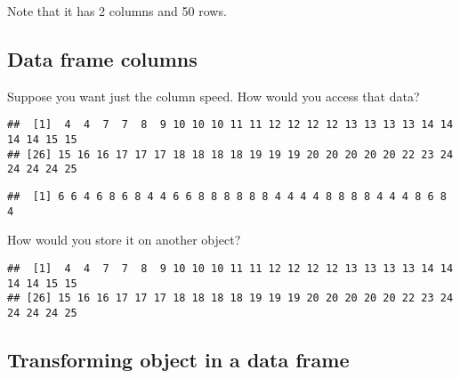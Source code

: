 \documentclass[
]{article}
\newenvironment{Shaded}{\begin{snugshade}}{\end{snugshade}}
\newcommand{\CommentTok}[1]{\textcolor[rgb]{0.56,0.35,0.01}{\textit{#1}}}
\newcommand{\NormalTok}[1]{#1}
\newcommand{\OtherTok}[1]{\textcolor[rgb]{0.56,0.35,0.01}{#1}}
\newcommand{\SpecialCharTok}[1]{\textcolor[rgb]{0.81,0.36,0.00}{\textbf{#1}}}
\begin{document}
Note that it has 2 columns and 50 rows.

\hypertarget{data-frame-columns}{%
\subsection{Data frame columns}\label{data-frame-columns}}

Suppose you want just the column speed. How would you access that data?

\begin{Shaded}
\end{Shaded}

\begin{verbatim}
##  [1]  4  4  7  7  8  9 10 10 10 11 11 12 12 12 12 13 13 13 13 14 14 14 14 15 15
## [26] 15 16 16 17 17 17 18 18 18 18 19 19 19 20 20 20 20 20 22 23 24 24 24 24 25
\end{verbatim}

\begin{Shaded}
\end{Shaded}

\begin{verbatim}
##  [1] 6 6 4 6 8 6 8 4 4 6 6 8 8 8 8 8 8 4 4 4 4 8 8 8 8 4 4 4 8 6 8 4
\end{verbatim}

How would you store it on another object?

\begin{Shaded}
\end{Shaded}

\begin{verbatim}
##  [1]  4  4  7  7  8  9 10 10 10 11 11 12 12 12 12 13 13 13 13 14 14 14 14 15 15
## [26] 15 16 16 17 17 17 18 18 18 18 19 19 19 20 20 20 20 20 22 23 24 24 24 24 25
\end{verbatim}

\hypertarget{transforming-object-in-a-data-frame}{%
\subsection{Transforming object in a data
frame}\label{transforming-object-in-a-data-frame}}
\end{document}
